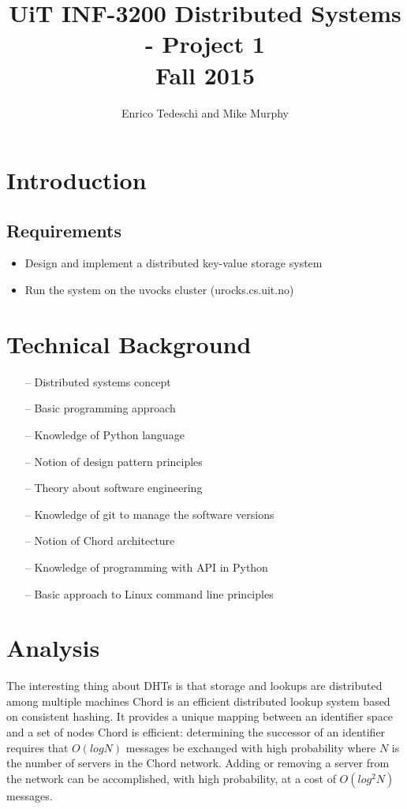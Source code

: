 \documentclass[11pt,conference]{IEEEtran}
\title{UiT INF-3200 Distributed Systems - Project 1\\Fall 2015}
\author{Enrico Tedeschi and Mike Murphy}
\begin{document}
\maketitle


\section{Introduction}

\subsection{Requirements}
\begin{itemize} 
\item Design and implement a distributed key-value storage system
\item Run the system on the uvocks cluster (urocks.cs.uit.no)
\end{itemize}


\section{Technical Background}

\begin{itemize} 
\item[--] Distributed systems concept
\item[--] Basic programming approach
\item[--] Knowledge of Python language
\item[--] Notion of design pattern principles
\item[--] Theory about software engineering
\item[--] Knowledge of git to manage the software versions
\item[--] Notion of Chord architecture
\item[--] Knowledge of programming with API in Python
\item[--] Basic approach to Linux command line principles
\end{itemize}


\section{Analysis}
The interesting thing about DHTs is that storage and lookups are distributed among multiple machines \cite{linuxjournal_dht}
Chord is an efficient distributed lookup system based on consistent hashing. It provides a
unique mapping between an identifier space and a set of nodes \cite{citation2}
\newline
Chord is efficient: determining the successor of an identifier requires that $O(log N)$ messages be exchanged with high probability where $N$ is the number of servers in the
Chord network. Adding or removing a server from the network
can be accomplished, with high probability, at a cost of $O(log^2 N)$ messages. \cite{citation2}
\end{document}
